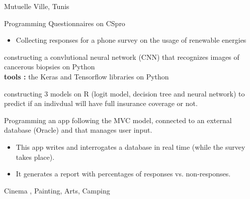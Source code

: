 \documentclass[10pt,a4paper]{altacv}
\begin{document}
 {Mutuelle Ville, Tunis}

Programming Questionnaires on CSpro 




\begin{itemize}
\item Collecting responses for a phone survey on the usage of renewable energies
\end{itemize}




 {}
constructing a convlutional neural network (CNN) that recognizes images of cancerous biopsies on Python\\
\textbf{tools :} the Keras and Tensorflow libraries on Python


 {}
constructing 3 models on R (logit model, decision tree and neural network) to predict if an indivdual will have full insurance coverage or not.


Programming an app following the MVC model, connected to an external database (Oracle) and that manages user input.


\begin{itemize}
\item This app writes and interrogates a database in real time (while the survey takes place).
\item It generates a report with percentages of responses vs. non-responses.
\end{itemize}










Cinema , Painting, Arts, Camping
\end{document}
